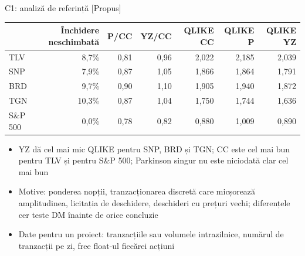 \ifsolutions
\begin{frame}{C1: analiză de referință [Propus]}
\itemsize{\footnotesize}
\begin{center}
\footnotesize
\begin{tabular}{lrrrrrr}
\toprule
& \textbf{Închidere neschimbată} & P/CC & YZ/CC & QLIKE CC & QLIKE P & QLIKE YZ \\
\midrule
TLV & 8{,}7\% & 0{,}81 & 0{,}96 & 2{,}022 & 2{,}185 & 2{,}039 \\
SNP & 7{,}9\% & 0{,}87 & 1{,}05 & 1{,}866 & 1{,}864 & 1{,}791 \\
BRD & 9{,}7\% & 0{,}90 & 1{,}10 & 1{,}905 & 1{,}940 & 1{,}872 \\
TGN & 10{,}3\% & 0{,}87 & 1{,}04 & 1{,}750 & 1{,}744 & 1{,}636 \\
S\&P 500 & 0{,}0\% & 0{,}78 & 0{,}82 & 0{,}880 & 1{,}009 & 0{,}890 \\
\bottomrule
\end{tabular}
\end{center}
\begin{itemize}
    \item YZ dă cel mai mic QLIKE pentru SNP, BRD și TGN; CC este cel mai bun pentru TLV și pentru S\&P 500; Parkinson singur nu este niciodată clar cel mai bun
    \item Motive: ponderea nopții, tranzacționarea discretă care micșorează amplitudinea, licitația de deschidere, deschideri cu prețuri vechi; diferențele cer teste DM înainte de orice concluzie
    \item Date pentru un proiect: tranzacțiile sau volumele intrazilnice, numărul de tranzacții pe zi, free float-ul fiecărei acțiuni
\end{itemize}
\end{frame}
\fi

